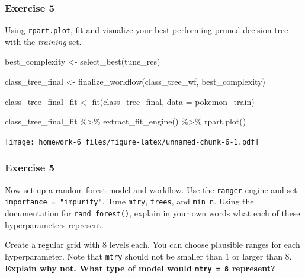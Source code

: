 \documentclass[
]{article}
\newenvironment{Shaded}{\begin{snugshade}}{\end{snugshade}}
\newcommand{\AttributeTok}[1]{\textcolor[rgb]{0.77,0.63,0.00}{#1}}
\newcommand{\FunctionTok}[1]{\textcolor[rgb]{0.00,0.00,0.00}{#1}}
\newcommand{\NormalTok}[1]{#1}
\newcommand{\OtherTok}[1]{\textcolor[rgb]{0.56,0.35,0.01}{#1}}
\newcommand{\SpecialCharTok}[1]{\textcolor[rgb]{0.00,0.00,0.00}{#1}}
\begin{document}
\hypertarget{exercise-5}{%
\subsubsection{Exercise 5}\label{exercise-5}}

Using \texttt{rpart.plot}, fit and visualize your best-performing pruned
decision tree with the \emph{training} set.

\begin{Shaded}
\begin{Highlighting}[]
\NormalTok{best\_complexity }\OtherTok{\textless{}{-}} \FunctionTok{select\_best}\NormalTok{(tune\_res)}

\NormalTok{class\_tree\_final }\OtherTok{\textless{}{-}} \FunctionTok{finalize\_workflow}\NormalTok{(class\_tree\_wf, best\_complexity)}

\NormalTok{class\_tree\_final\_fit }\OtherTok{\textless{}{-}} \FunctionTok{fit}\NormalTok{(class\_tree\_final, }\AttributeTok{data =}\NormalTok{ pokemon\_train)}

\NormalTok{class\_tree\_final\_fit }\SpecialCharTok{\%\textgreater{}\%}
  \FunctionTok{extract\_fit\_engine}\NormalTok{() }\SpecialCharTok{\%\textgreater{}\%}
  \FunctionTok{rpart.plot}\NormalTok{()}
\end{Highlighting}
\end{Shaded}

\texttt{[image: homework-6\_files/figure-latex/unnamed-chunk-6-1.pdf]}

\hypertarget{exercise-5-1}{%
\subsubsection{Exercise 5}\label{exercise-5-1}}

Now set up a random forest model and workflow. Use the \texttt{ranger}
engine and set \texttt{importance\ =\ "impurity"}. Tune \texttt{mtry},
\texttt{trees}, and \texttt{min\_n}. Using the documentation for
\texttt{rand\_forest()}, explain in your own words what each of these
hyperparameters represent.

Create a regular grid with 8 levels each. You can choose plausible
ranges for each hyperparameter. Note that \texttt{mtry} should not be
smaller than 1 or larger than 8. \textbf{Explain why not. What type of
model would \texttt{mtry\ =\ 8} represent?}
\end{document}
